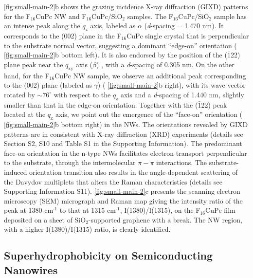  \autoref{fig:small-main-2}b shows the grazing incidence X-ray diffraction
(GIXD) patterns for the F\(_{\text{16}}\)CuPc NW and F\(_{\text{16}}\)CuPc/SiO\(_{\text{2}}\)
samples. The F\(_{\text{16}}\)CuPc/SiO\(_{\text{2}}\) sample has an intense peak along the
\(q_{\mathrm{z}}\) axis, labeled as \(\alpha\) (\emph{d}-spacing = 1.470
nm). It corresponds to the (002) plane in the F\(_{\text{16}}\)CuPc single
crystal \cite{Yang_2009_F16_PTCDA} that is perpendicular to the
substrate normal vector, suggesting a dominant ``edge-on'' orientation
( \autoref{fig:small-main-2}b bottom left). It is also endorsed by the
position of the (\(\bar{1}\)22) plane peak near the \(q_{\mathrm{xy}}\)
axis (\(\beta\)) \cite{Yoon_2010_crystal_F16}, with a \emph{d}-spacing of
0.305 nm. On the other hand, for the F\(_{\text{16}}\)CuPc NW sample, we observe
an additional peak corresponding to the (002) plane (labeled as
\(\gamma\)) ( \autoref{fig:small-main-2}b right), with its wave vector rotated
by \(\sim 76^{\circ}\) with respect to the \(q_{\mathrm{z}}\) axis and a
\emph{d}-spacing of 1.440 nm, slightly smaller than that in the edge-on
orientation. Together with the (\(\bar{1}\)22) peak located at the
\(q_{\mathrm{z}}\) axis, we point out the emergence of the ``face-on''
orientation ( \autoref{fig:small-main-2}b bottom right) in the NWs. The
orientations revealed by GIXD patterns are in consistent with X-ray
diffraction (XRD) experiments (details see Section S2,  S10 and
Table S1 in the Supporting Information). The predominant face-on
orientation in the n-type NWs facilitates electron transport
perpendicular to the substrate, through the intermolecular \(\pi-\pi\)
interactions. The substrate-induced orientation transition also
results in the angle-dependent scattering of the Davydov multiplets
that alters the Raman characteristics \cite{Cerdeira_2013_RamanF16}
(details see Supporting Information  S11). 
\autoref{fig:small-main-2}c presents the scanning electron microscopy (SEM)
micrograph and Raman map giving the intensity ratio of the peak at
1380 cm\(^{\text{-1}}\) to that at 1315 cm\(^{\text{-1}}\), I(1380)/I(1315), on the
F\(_{\text{16}}\)CuPc film deposited on a sheet of SiO\(_{\text{2}}\)-supported graphene
with a break. The NW region, with a higher I(1380)/I(1315) ratio, is
clearly identified.


\subsection{Superhydrophobicity on Semiconducting Nanowires}
\label{sec:small-superhydr-nw}


